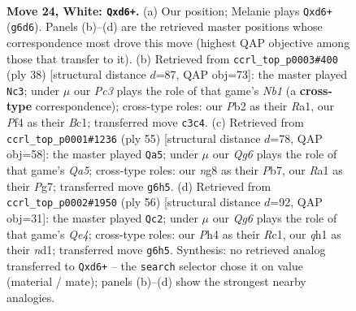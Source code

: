 \documentclass[11pt]{article}
\begin{document}
\clearpage

\begin{figure}[p]\centering
\begin{subfigure}{0.46\textwidth}\centering
\resizebox{\linewidth}{!}{%
\newchessgame
\chessboard[
  setfen={3k2nr/2r3p1/p2b2Q1/2p3Pp/5P1P/2P5/PP3K2/RNB4q w - - 0 24},
  showmover=false,
  pgfstyle=straightmove, color=movearrow, markmove={g6-d6}
]}
\caption{}
\end{subfigure}\hfill
\begin{subfigure}{0.46\textwidth}\centering
\resizebox{\linewidth}{!}{%
\newchessgame
\chessboard[
  setfen={r4rk1/pp4np/3pb1p1/8/2PQPP1q/5R2/PP5P/RNB4K w - - 1 20},
  showmover=false,
  pgfstyle=straightmove, color=movearrow, markmove={b1-c3}
]}
\caption{}
\end{subfigure}
\\[4pt]
\begin{subfigure}{0.46\textwidth}\centering
\resizebox{\linewidth}{!}{%
\newchessgame
\chessboard[
  setfen={r5k1/ppb3p1/4p2p/2Q1Np2/q4n2/5P2/PPP5/1K1RR3 b - - 5 28},
  showmover=false,
  pgfstyle=straightmove, color=movearrow, markmove={a4-a5}
]}
\caption{}
\end{subfigure}\hfill
\begin{subfigure}{0.46\textwidth}\centering
\resizebox{\linewidth}{!}{%
\newchessgame
\chessboard[
  setfen={4r1k1/Np3pp1/5b2/2B1p2p/4Q2P/6P1/P2qPPK1/2Rn4 w - - 5 29},
  showmover=false,
  pgfstyle=straightmove, color=movearrow, markmove={e4-c2}
]}
\caption{}
\end{subfigure}
\caption{\textbf{Move 24, White: \texttt{Qxd6+}.} (a) Our position; Melanie plays \texttt{Qxd6+} (\texttt{g6d6}). Panels (b)--(d) are the retrieved master positions whose correspondence most drove this move (highest QAP objective among those that transfer to it). (b) Retrieved from \texttt{ccrl\_top\_p0003\#400} (ply 38) [structural distance $d$=87, QAP obj=73]: the master played \texttt{Nc3}; under $\mu$ our \emph{Pc3} plays the role of that game's \emph{Nb1} (a \textbf{cross-type} correspondence); cross-type roles: our \emph{P}b2 as their \emph{R}a1, our \emph{P}f4 as their \emph{B}c1; transferred move \texttt{c3c4}. (c) Retrieved from \texttt{ccrl\_top\_p0001\#1236} (ply 55) [structural distance $d$=78, QAP obj=58]: the master played \texttt{Qa5}; under $\mu$ our \emph{Qg6} plays the role of that game's \emph{Qa5}; cross-type roles: our \emph{n}g8 as their \emph{P}b7, our \emph{R}a1 as their \emph{P}g7; transferred move \texttt{g6h5}. (d) Retrieved from \texttt{ccrl\_top\_p0002\#1950} (ply 56) [structural distance $d$=92, QAP obj=31]: the master played \texttt{Qc2}; under $\mu$ our \emph{Qg6} plays the role of that game's \emph{Qe4}; cross-type roles: our \emph{P}h4 as their \emph{R}c1, our \emph{q}h1 as their \emph{n}d1; transferred move \texttt{g6h5}. Synthesis: no retrieved analog transferred to \texttt{Qxd6+} -- the \texttt{search} selector chose it on value (material / mate); panels (b)--(d) show the strongest nearby analogies.}
\label{fig:thought-m46}
\end{figure}
\end{document}

